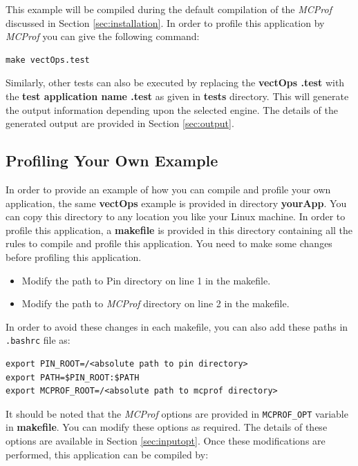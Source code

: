 \documentclass[11pt]{article}
\newcommand{\MCPROF}{\emph{MCProf}}
\begin{document}
This example will be compiled during the default compilation of the \MCPROF{}
discussed in Section \ref{sec:installation}. In order to profile this
application by \MCPROF{} you can give the following command:

{
\small
\begin{Verbatim}[frame=single]
make vectOps.test
\end{Verbatim}
}

Similarly, other tests can also be executed by replacing the
\textbf{\textlangle vectOps \textrangle.test} with the
\textbf{\textlangle test application name \textrangle.test} as
given in \textbf{tests} directory. This will generate the output information
depending upon the selected engine. The details of the generated output are
provided in Section \ref{sec:output}.

\subsection{Profiling Your Own Example}

In order to provide an example of how you can compile and profile your own
application, the same \textbf{vectOps} example is provided in directory
\textbf{yourApp}. You can copy this directory to any location you like your
Linux machine. In order to profile this application, a \textbf{makefile} is
provided in this directory containing all the rules to compile and profile this
application. You need to make some changes before profiling this application.

\begin{itemize}
\item Modify the path to Pin directory on line 1 in the makefile.
\item Modify the path to \MCPROF{} directory on line 2 in the makefile.
\end{itemize}

In order to avoid these changes in each makefile, you can also add these paths
in \verb|.bashrc| file as:

{
\small
\begin{Verbatim}[frame=single]
export PIN_ROOT=/<absolute path to pin directory>
export PATH=$PIN_ROOT:$PATH
export MCPROF_ROOT=/<absolute path to mcprof directory>
\end{Verbatim}
}

It should be noted that the \MCPROF{} options are provided in \verb|MCPROF_OPT|
variable in \textbf{makefile}. You can modify these options as required. The
details of these options are available in Section \ref{sec:inputopt}. Once these
modifications are performed, this application can be compiled by:
\end{document}
